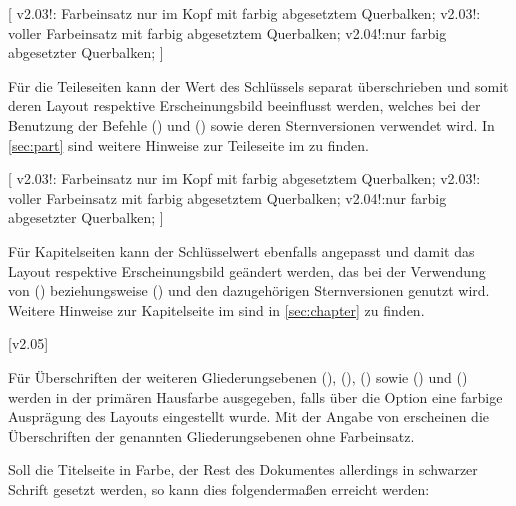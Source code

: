 \begin{DeclareEntity*}{}
\begin{DeclareEntity*}{}
\begin{DeclareEntity*}{}
\begin{Declaration}
  {}
[%
  v2.03!:%
    Farbeinsatz nur im Kopf mit farbig abgesetztem Querbalken;
  v2.03!:%
    voller Farbeinsatz mit farbig abgesetztem Querbalken;
  v2.04!:nur farbig abgesetzter Querbalken;%
]
\printdeclarationlist[Teil|?]

Für die Teileseiten kann der Wert des Schlüssels  separat 
überschrieben und somit deren Layout respektive Erscheinungsbild beeinflusst 
werden, welches bei der Benutzung der Befehle 
() und () 
sowie deren Sternversionen verwendet wird. In \autoref{sec:part} sind weitere 
Hinweise zur Teileseite im 
\CD zu finden.
\end{Declaration}

\begin{Declaration}
  {}
[%
  v2.03!:%
    Farbeinsatz nur im Kopf mit farbig abgesetztem Querbalken;
  v2.03!:%
    voller Farbeinsatz mit farbig abgesetztem Querbalken;
  v2.04!:nur farbig abgesetzter Querbalken;%
]
\printdeclarationlist[Kapitel|?]

Für Kapitelseiten kann der Schlüsselwert  ebenfalls angepasst 
und damit das Layout respektive Erscheinungsbild geändert werden, das bei der 
Verwendung von () beziehungsweise 
() und den dazugehörigen Sternversionen 
genutzt wird. Weitere Hinweise zur Kapitelseite im \CD sind in 
\autoref{sec:chapter} zu finden.
\end{Declaration}

\begin{Declaration}
  {}
  [v2.05]
\printdeclarationlist

Für Überschriften der weiteren Gliederungsebenen
(), 
(), 
() sowie 
() und 
()
werden in der primären Hausfarbe  ausgegeben, falls über die 
Option  eine farbige Ausprägung des Layouts eingestellt 
wurde. Mit der Angabe von  erscheinen die Überschriften 
der genannten Gliederungsebenen ohne Farbeinsatz.%
\end{Declaration}
%
\begin{Example}
Soll die Titelseite in Farbe, der Rest des Dokumentes allerdings in schwarzer 
Schrift gesetzt werden, so kann dies folgendermaßen erreicht werden:
\end{Example}
%




\end{DeclareEntity*}
\end{DeclareEntity*}
\end{DeclareEntity*}
